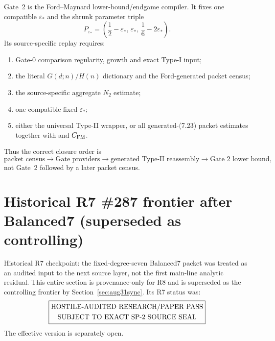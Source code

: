 \documentclass[11pt]{article}
\theoremstyle{definition}
\newcommand{\1}{\mathbf 1}
\begin{document}
Gate~2 is the Ford--Maynard lower-bound/endgame compiler.  It fixes one compatible
$\varepsilon_\ast$ and the shrunk parameter triple
\[
P_{\varepsilon_\ast}
=
\left(
\frac12-\varepsilon_\ast,\,
\varepsilon_\ast,\,
\frac16-2\varepsilon_\ast
\right).
\]
Its source-specific replay requires:
\begin{enumerate}[leftmargin=1.7em]
\item Gate-0 comparison regularity, growth and exact Type-I input;
\item the literal $G(d;n)/H(n)$ dictionary and the Ford-generated packet census;
\item the source-specific aggregate $N_2$ estimate;
\item one compatible fixed $\varepsilon_\ast$;
\item either the universal Type-II wrapper, or all generated-(7.23) packet estimates
  together with  and $C_{\rm FM}$.
\end{enumerate}
Thus the correct closure order is
\[
\text{packet census}
\to
\text{Gate providers}
\to
\text{generated Type-II reassembly}
\to
\text{Gate 2 lower bound},
\]
not Gate~2 followed by a later packet census.

\section{Historical R7 \#287 frontier after Balanced7 (superseded as controlling)}
\label{sec:fixed-degree-seven-ledger}

Historical R7 checkpoint: the fixed-degree-seven Balanced7 packet was treated as an audited input to the next source layer,
not the first main-line analytic residual.  This entire section is provenance-only for R8 and is superseded as the controlling frontier by Section~\ref{sec:aug31sync}.  Its R7 status was:
\[
\boxed{\begin{gathered}
\text{\rm HOSTILE-AUDITED RESEARCH/PAPER PASS}\\
\text{\rm SUBJECT TO EXACT SP-2 SOURCE SEAL}
\end{gathered}}
\]
The effective version is separately open.
\end{document}
